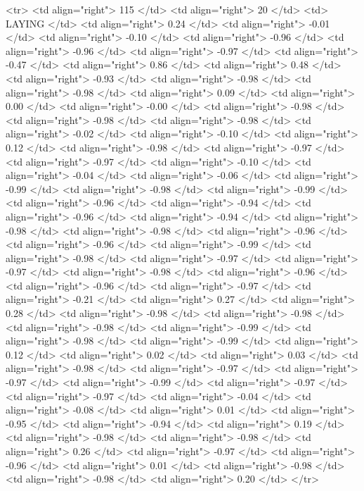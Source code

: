   <tr> <td align="right"> 115 </td> <td align="right">  20 </td> <td> LAYING </td> <td align="right"> 0.24 </td> <td align="right"> -0.01 </td> <td align="right"> -0.10 </td> <td align="right"> -0.96 </td> <td align="right"> -0.96 </td> <td align="right"> -0.97 </td> <td align="right"> -0.47 </td> <td align="right"> 0.86 </td> <td align="right"> 0.48 </td> <td align="right"> -0.93 </td> <td align="right"> -0.98 </td> <td align="right"> -0.98 </td> <td align="right"> 0.09 </td> <td align="right"> 0.00 </td> <td align="right"> -0.00 </td> <td align="right"> -0.98 </td> <td align="right"> -0.98 </td> <td align="right"> -0.98 </td> <td align="right"> -0.02 </td> <td align="right"> -0.10 </td> <td align="right"> 0.12 </td> <td align="right"> -0.98 </td> <td align="right"> -0.97 </td> <td align="right"> -0.97 </td> <td align="right"> -0.10 </td> <td align="right"> -0.04 </td> <td align="right"> -0.06 </td> <td align="right"> -0.99 </td> <td align="right"> -0.98 </td> <td align="right"> -0.99 </td> <td align="right"> -0.96 </td> <td align="right"> -0.94 </td> <td align="right"> -0.96 </td> <td align="right"> -0.94 </td> <td align="right"> -0.98 </td> <td align="right"> -0.98 </td> <td align="right"> -0.96 </td> <td align="right"> -0.96 </td> <td align="right"> -0.99 </td> <td align="right"> -0.98 </td> <td align="right"> -0.97 </td> <td align="right"> -0.97 </td> <td align="right"> -0.98 </td> <td align="right"> -0.96 </td> <td align="right"> -0.96 </td> <td align="right"> -0.97 </td> <td align="right"> -0.21 </td> <td align="right"> 0.27 </td> <td align="right"> 0.28 </td> <td align="right"> -0.98 </td> <td align="right"> -0.98 </td> <td align="right"> -0.98 </td> <td align="right"> -0.99 </td> <td align="right"> -0.98 </td> <td align="right"> -0.99 </td> <td align="right"> 0.12 </td> <td align="right"> 0.02 </td> <td align="right"> 0.03 </td> <td align="right"> -0.98 </td> <td align="right"> -0.97 </td> <td align="right"> -0.97 </td> <td align="right"> -0.99 </td> <td align="right"> -0.97 </td> <td align="right"> -0.97 </td> <td align="right"> -0.04 </td> <td align="right"> -0.08 </td> <td align="right"> 0.01 </td> <td align="right"> -0.95 </td> <td align="right"> -0.94 </td> <td align="right"> 0.19 </td> <td align="right"> -0.98 </td> <td align="right"> -0.98 </td> <td align="right"> 0.26 </td> <td align="right"> -0.97 </td> <td align="right"> -0.96 </td> <td align="right"> 0.01 </td> <td align="right"> -0.98 </td> <td align="right"> -0.98 </td> <td align="right"> 0.20 </td> </tr>
